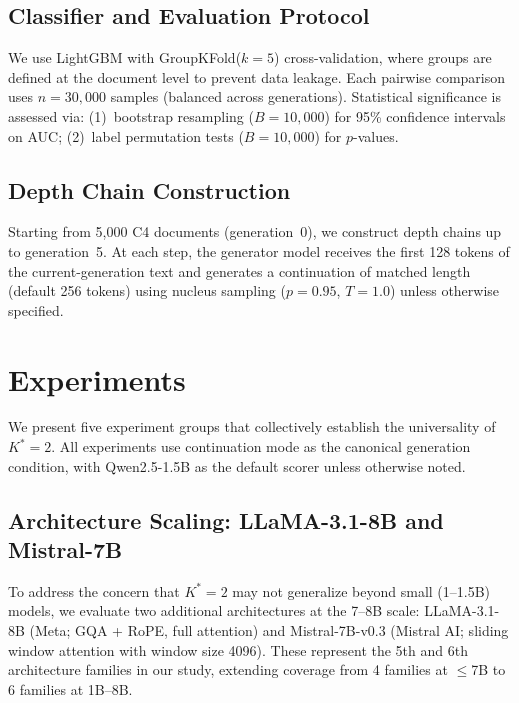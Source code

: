 \documentclass[11pt]{article}
\newcommand{\Kstar}{K^{*}}
\begin{document}
\subsection{Classifier and Evaluation Protocol}
\label{sec:classifier}

We use LightGBM with GroupKFold($k\!=\!5$) cross-validation, where groups are defined at the document level to prevent data leakage.
Each pairwise comparison uses $n\!=\!30{,}000$ samples (balanced across generations).
Statistical significance is assessed via:
(1)~bootstrap resampling ($B\!=\!10{,}000$) for 95\% confidence intervals on AUC;
(2)~label permutation tests ($B\!=\!10{,}000$) for $p$-values.

\subsection{Depth Chain Construction}
\label{sec:depth_chain}

Starting from 5{,}000 C4 documents (generation~0), we construct depth chains up to generation~5.
At each step, the generator model receives the first 128 tokens of the current-generation text and generates a continuation of matched length (default 256 tokens) using nucleus sampling ($p\!=\!0.95$, $T\!=\!1.0$) unless otherwise specified.

\section{Experiments}
\label{sec:experiments}

We present five experiment groups that collectively establish the universality of $\Kstar\!=\!2$.
All experiments use continuation mode as the canonical generation condition, with Qwen2.5-1.5B as the default scorer unless otherwise noted.

\subsection{Architecture Scaling: LLaMA-3.1-8B and Mistral-7B}
\label{sec:exp_scaling}

To address the concern that $\Kstar\!=\!2$ may not generalize beyond small (1--1.5B) models, we evaluate two additional architectures at the 7--8B scale: LLaMA-3.1-8B (Meta; GQA + RoPE, full attention) and Mistral-7B-v0.3 (Mistral AI; sliding window attention with window size 4096).
These represent the 5th and 6th architecture families in our study, extending coverage from 4 families at $\leq$7B to 6 families at 1B--8B.
\end{document}
